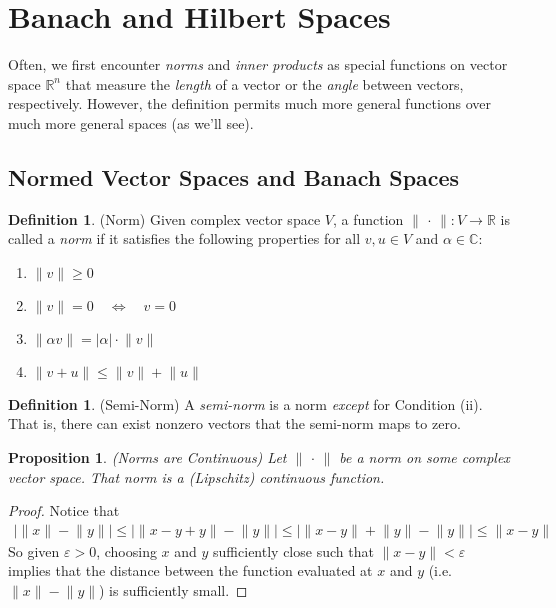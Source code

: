 \documentclass[12pt]{article}
\numberwithin{equation}{section} %
\theoremstyle{plain}
\newtheorem{prop}[thm]{Proposition}
\theoremstyle{definition}
\newtheorem{defn}[thm]{Definition}
\theoremstyle{remark}
\newcommand{\R}{\mathbb{R}}
\newcommand{\Rn}{\mathbb{R}^n}
\newcommand{\C}{\mathbb{C}}
\begin{document}
\clearpage
\section{Banach and Hilbert Spaces}
\label{sec:banachhilbert}

Often, we first encounter \emph{norms} and \emph{inner products} as
special functions on vector space $\Rn$ that measure the \emph{length}
of a vector or the \emph{angle} between vectors, respectively.  However,
the definition permits much more general functions over much more
general spaces (as we'll see).


\clearpage
\subsection{Normed Vector Spaces and Banach Spaces}


\begin{defn}(Norm)
Given complex vector space $V$, a function
$\lVert\,\cdot\,\rVert:V\rightarrow \R$ is called a \emph{norm} if it
satisfies the following properties for all $v,u\in V$ and $\alpha\in
\C$:
\begin{enumerate}[label=(\roman*)]
  \item $\lVert v\rVert\geq 0$
  \item $\lVert v\rVert=0 \quad \iff \quad v=0$
  \item $\lVert \alpha v\rVert= |\alpha| \cdot \lVert v\rVert$
  \item $\lVert v+u\rVert \leq \lVert v\rVert + \lVert u\rVert$
\end{enumerate}
\end{defn}

\begin{defn}(Semi-Norm)
A \emph{semi-norm} is a norm \emph{except} for Condition (ii). That is,
there can exist nonzero vectors that the semi-norm maps to zero.
\end{defn}

\begin{prop}\emph{(Norms are Continuous)}
Let $\lVert \,\cdot\,\rVert$ be a norm on some complex vector space.
That norm is a (Lipschitz) continuous function.
\end{prop}
\begin{proof}
Notice that
\begin{align*}
    \big\lvert \lVert x \rVert - \lVert y\rVert \big\rvert
    \leq
    \big\lvert \lVert x - y + y\rVert - \lVert y\rVert \big\rvert
    \leq
    \big\lvert \lVert x - y \rVert + \lVert y\rVert - \lVert y\rVert \big\rvert
    \leq
    \lVert x - y \rVert
\end{align*}
So given $\varepsilon>0$, choosing $x$ and $y$ sufficiently close such
that $\lVert x-y\rVert<\varepsilon$ implies that the distance between
the function evaluated at $x$ and $y$ (i.e.
$\lVert x\rVert- \lVert y\rVert$) is sufficiently small.
\end{proof}
\end{document}
